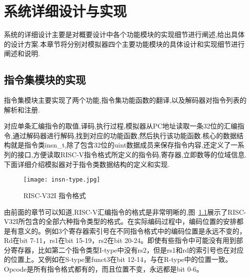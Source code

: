 
\chapter{系统详细设计与实现}

系统的详细设计主要是对概要设计中各个功能模块的实现细节进行阐述,给出具体的设计方案.本章节将分别对模拟器四个主要功能模块的具体设计和实现细节进行阐述和说明.

\section{指令集模块的实现}

指令集模块主要实现了两个功能,指令集功能函数的翻译,以及解码器对指令列表的解析和注册.

对应单条汇编指令的取值,译码,执行过程,模拟器从PC地址读取一条32位的汇编指令,通过解码器进行解码,找到对应的功能函数,然后执行该功能函数.核心的数据结构就是指令类insn\_t,除了包含32位的uint数据成员来保存指令内容,还定义了一系列的接口,方便读取RISC-V指令格式所定义的指令码,寄存器,立即数等的位域信息.下面详细介绍模拟器对于指令类数据结构的定义和实现.
\begin{figure}[h]
    \centering
    \texttt{[image: insn-type.jpg]}
    \caption{RISC-V32I 指令格式}
    \label{fig:insn-type}
\end{figure}
由前面的章节可以知道,RISC-V汇编指令的格式是非常明晰的,图~\ref{fig:insn-type}展示了RISC-V32I所包含的全部六种指令类型的格式。在实际编码过程中，编码位置的安排都是有意义的。例如3个寄存器索引号在不同指令格式中的编码位置是永远不变的，Rd在bit 7-11，rs1在bit 15-19，rs2在bit 20-24。即使有些指令中可能没有用到部分寄存器，比如第二个指令类型I-type中没有rs2，但是rs1和rd的索引号也在对应的位置上。又例如在S-type里funct3在bit 12-14，与在R-type中的位置一致。Opcode是所有指令格式都有的，而且位置不变，永远都是bit 0-6。


